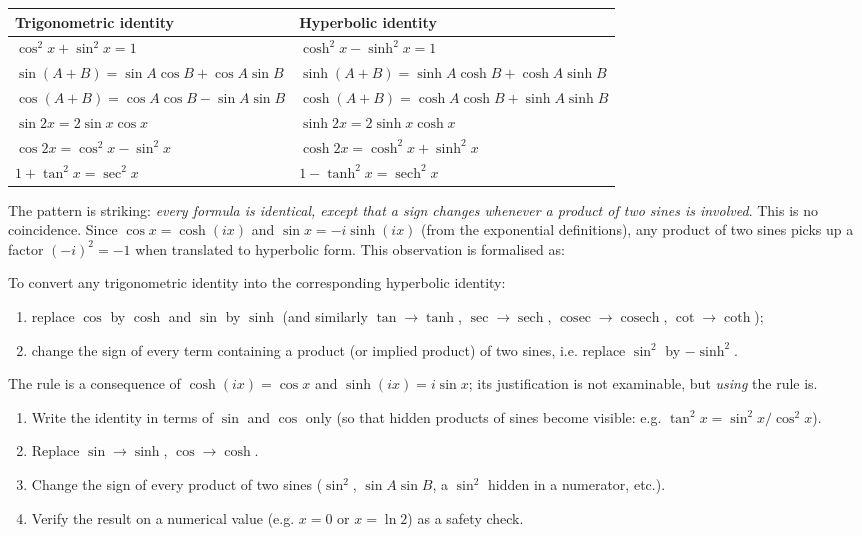 \documentclass[11pt]{article}
\begin{document}
\begin{center}
\begin{tabularx}{\linewidth}{|X|X|}
\hline
\rowcolor{popblueL} \textbf{Trigonometric identity} & \textbf{Hyperbolic identity}\\
\hline
$\cos^{2}x+\sin^{2}x=1$ & $\cosh^{2}x-\sinh^{2}x=1$\\
\hline
$\sin(A+B)=\sin A\cos B+\cos A\sin B$ & $\sinh(A+B)=\sinh A\cosh B+\cosh A\sinh B$\\
\hline
$\cos(A+B)=\cos A\cos B-\sin A\sin B$ & $\cosh(A+B)=\cosh A\cosh B+\sinh A\sinh B$\\
\hline
$\sin 2x=2\sin x\cos x$ & $\sinh 2x=2\sinh x\cosh x$\\
\hline
$\cos 2x=\cos^{2}x-\sin^{2}x$ & $\cosh 2x=\cosh^{2}x+\sinh^{2}x$\\
\hline
$1+\tan^{2}x=\sec^{2}x$ & $1-\tanh^{2}x=\operatorname{sech}^{2}x$\\
\hline
\end{tabularx}
\end{center}

The pattern is striking: \emph{every formula is identical, except that a sign changes whenever a product of two sines is involved}. This is no coincidence. Since $\cos x=\cosh(ix)$ and $\sin x=-i\sinh(ix)$ (from the exponential definitions), any product of two sines picks up a factor $(-i)^{2}=-1$ when translated to hyperbolic form. This observation is formalised as:

\begin{propriete}
To convert any trigonometric identity into the corresponding hyperbolic identity:
\begin{enumerate}
\item replace $\cos$ by $\cosh$ and $\sin$ by $\sinh$ (and similarly $\tan\to\tanh$, $\sec\to\operatorname{sech}$, $\operatorname{cosec}\to\operatorname{cosech}$, $\cot\to\coth$);
\item change the sign of every term containing a product (or implied product) of two sines, i.e. replace $\sin^{2}$ by $-\sinh^{2}$.
\end{enumerate}
The rule is a consequence of $\cosh(ix)=\cos x$ and $\sinh(ix)=i\sin x$; its justification is not examinable, but \emph{using} the rule is.
\end{propriete}

\begin{methode}
\begin{enumerate}
\item Write the identity in terms of $\sin$ and $\cos$ only (so that hidden products of sines become visible: e.g. $\tan^{2}x=\sin^{2}x/\cos^{2}x$).
\item Replace $\sin\to\sinh$, $\cos\to\cosh$.
\item Change the sign of every product of two sines ($\sin^{2}$, $\sin A\sin B$, a $\sin^{2}$ hidden in a numerator, etc.).
\item Verify the result on a numerical value (e.g. $x=0$ or $x=\ln 2$) as a safety check.
\end{enumerate}
\end{methode}
\end{document}
